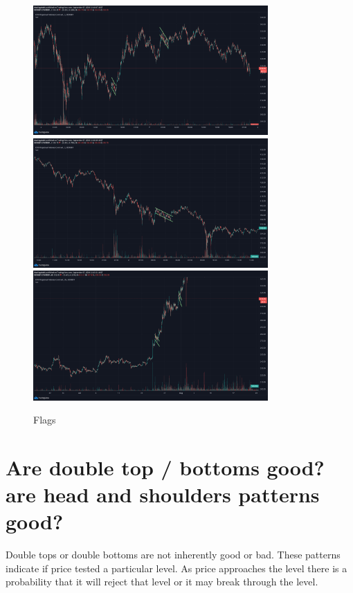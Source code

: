 \begin{figure}[H]
\center
\includegraphics[width=0.8\textwidth]{fig/flag/f1.png}
\includegraphics[width=0.8\textwidth]{fig/flag/f2.png}
\includegraphics[width=0.8\textwidth]{fig/flag/f3.png}
\caption{Flags}
\end{figure}

\section{ Are double top / bottoms good? are head and shoulders patterns good?}
Double tops or double bottoms are not inherently good or bad. These patterns indicate if price tested a particular level. As price approaches the level there is a probability that it will reject that level or it may break through the level.

